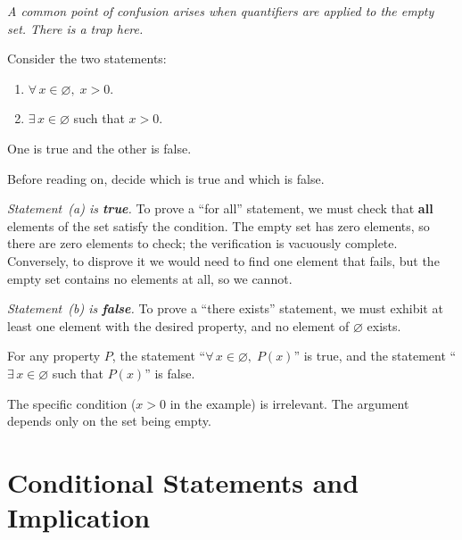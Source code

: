 \textit{A common point of confusion arises when quantifiers are applied to the empty set.  There is a trap here.}

\begin{example}
\label{ex:1-7}
Consider the two statements:
\begin{enumerate}[label=(\alph*)]
  \item $\forall\, x \in \varnothing,\; x > 0$.
  \item $\exists\, x \in \varnothing$ such that $x > 0$.
\end{enumerate}
One is true and the other is false.
\end{example}

\begin{remark}
Before reading on, decide which is true and which is false.
\end{remark}

\textit{Statement~(a) is \textbf{true}.}  To prove a ``for all'' statement, we must check that \textbf{all} elements of the set satisfy the condition.  The empty set has zero elements, so there are zero elements to check; the verification is vacuously complete.  Conversely, to disprove it we would need to find one element that fails, but the empty set contains no elements at all, so we cannot.

\textit{Statement~(b) is \textbf{false}.}  To prove a ``there exists'' statement, we must exhibit at least one element with the desired property, and no element of $\varnothing$ exists.

\begin{theorem}
\label{thm:1-5}
For any property $P$, the statement ``$\forall\, x \in \varnothing,\; P(x)$'' is true, and the statement ``$\exists\, x \in \varnothing$ such that $P(x)$'' is false.
\end{theorem}

\begin{remark}
The specific condition ($x > 0$ in the example) is irrelevant.  The argument depends only on the set being empty.
\end{remark}

\section{Conditional Statements and Implication}
\label{sec:1.7}

